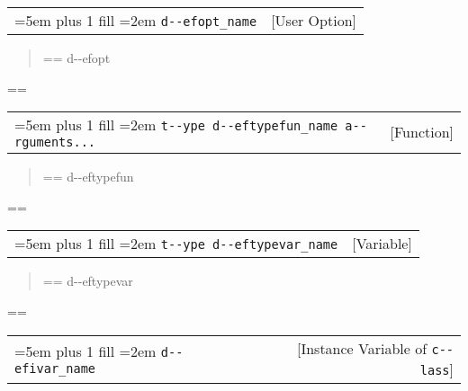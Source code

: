 \documentclass{book}
\makeatletter
\newenvironment{GNUTexinfopreformatted}{%
  \par\GNUTobeylines\obeyspaces\frenchspacing
  \parskip=\z@\parindent=\z@}{}
{\catcode`\^^M=13 \gdef\GNUTobeylines{\catcode`\^^M=13 \def^^M{\null\par}}}
\newenvironment{GNUTexinfoindented}
  {\begin{list}{}{}
  \item\relax}
  {\end{list}}
\makeatother
\begin{document}
\begin{GNUTexinfoindented}
\noindent\begin{tabularx}{\linewidth}{@{}Xr}
\rightskip=5em plus 1 fill
\hangindent=2em
\texttt{d{-}{-}efopt\_name}& [User Option]
\end{tabularx}

%
\begin{quote}
\unskip{\parskip=0pt\noindent}%
\begin{GNUTexinfopreformatted}%
\ttfamily d{-}{-}efopt
\end{GNUTexinfopreformatted}
\end{quote}
\begin{GNUTexinfopreformatted}%
\ttfamily 
\end{GNUTexinfopreformatted}

\noindent\begin{tabularx}{\linewidth}{@{}Xr}
\rightskip=5em plus 1 fill
\hangindent=2em
\texttt{t{-}{-}ype d{-}{-}eftypefun\_name a{-}{-}rguments...}& [Function]
\end{tabularx}

%
\begin{quote}
\unskip{\parskip=0pt\noindent}%
\begin{GNUTexinfopreformatted}%
\ttfamily d{-}{-}eftypefun
\end{GNUTexinfopreformatted}
\end{quote}
\begin{GNUTexinfopreformatted}%
\ttfamily 
\end{GNUTexinfopreformatted}

\noindent\begin{tabularx}{\linewidth}{@{}Xr}
\rightskip=5em plus 1 fill
\hangindent=2em
\texttt{t{-}{-}ype d{-}{-}eftypevar\_name}& [Variable]
\end{tabularx}

%
\begin{quote}
\unskip{\parskip=0pt\noindent}%
\begin{GNUTexinfopreformatted}%
\ttfamily d{-}{-}eftypevar
\end{GNUTexinfopreformatted}
\end{quote}
\begin{GNUTexinfopreformatted}%
\ttfamily 
\end{GNUTexinfopreformatted}

\noindent\begin{tabularx}{\linewidth}{@{}Xr}
\rightskip=5em plus 1 fill
\hangindent=2em
\texttt{d{-}{-}efivar\_name}& [Instance Variable of \texttt{c{-}{-}lass}]
\end{tabularx}


\end{GNUTexinfoindented}
\end{document}
